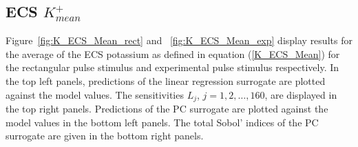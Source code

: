 \subsection{ECS $K^+_{mean}$}
\label{sec:qoi_K_ECS_Mean}

Figure~\ref{fig:K_ECS_Mean_rect} and ~\ref{fig:K_ECS_Mean_exp} display results for the average of the ECS potassium as defined in equation (\ref{K_ECS_Mean}) for the rectangular pulse stimulus and experimental pulse stimulus respectively. In the top left panels, predictions of the linear regression surrogate are plotted against the model values. The sensitivities $L_j$, $j=1,2,\dots,160$, are displayed in the top right panels. Predictions of the PC surrogate are plotted against the model values in the bottom left panels. The total Sobol' indices of the PC surrogate are given in the bottom right panels. 

